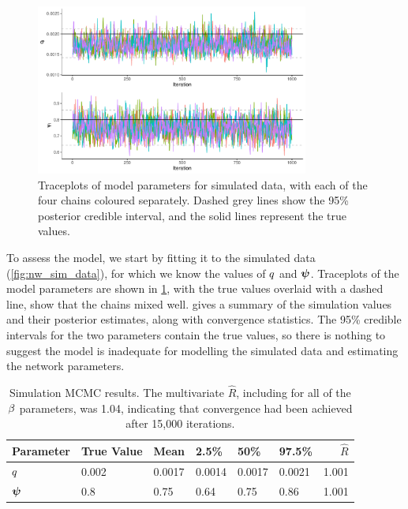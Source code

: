 \begin{knitrout}\small
{}\color{fgcolor}\begin{figure}

{\centering \includegraphics[width=0.8\textwidth]{figure/nw_model_sim_results-1} 

}

\caption[Traceplots of model parameters for simulated data, with each of the four chains coloured separately]{Traceplots of model parameters for simulated data, with each of the four chains coloured separately. Dashed grey lines show the 95\% posterior credible interval, and the solid lines represent the true values.}\label{fig:nw_model_sim_results}
\end{figure}


\end{knitrout}


To assess the model, we start by fitting it to the simulated data (\cref{fig:nw_sim_data}), for which we know the values of $q$ and $\mathbf{\boldsymbol{\psi}}$. Traceplots of the model parameters are shown in \cref{fig:nw_model_sim_results}, with the true values overlaid with a dashed line, show that the chains mixed well.  gives a summary of the simulation values and their posterior estimates, along with convergence statistics. The 95\% credible intervals for the two parameters contain the true values, so there is nothing to suggest the model is inadequate for modelling the simulated data and estimating the network parameters.


\begin{table}

\caption{\label{tab:nw_model_sim_smry}Simulation MCMC results. The multivariate $\hat R$, including for all of the $\beta$ parameters, was 1.04, indicating that convergence had been achieved after 15,000 iterations.}
\centering
\begin{tabular}[b]{llllllr}
\toprule
Parameter & True Value & Mean & 2.5\% & 50\% & 97.5\% & $\hat R$\\
\midrule
$q$ & 0.002 & 0.0017 & 0.0014 & 0.0017 & 0.0021 & 1.001\\
$\mathbf{\boldsymbol{\psi}}$ & 0.8 & 0.75 & 0.64 & 0.75 & 0.86 & 1.001\\
\bottomrule
\end{tabular}
\end{table}





